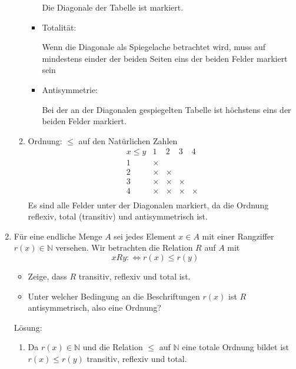 \documentclass[main.tex]{subfiles}
\begin{document}
\begin{enumerate}
\begin{enumerate}
\begin{itemize}
			                  Die Diagonale der Tabelle ist markiert.
			            \item Totalität:

			                  Wenn die Diagonale als Spiegelache betrachtet wird, muss auf mindestens
			                  einder der beiden Seiten eins der beiden Felder markiert sein
			            \item Antisymmetrie:

			                  Bei der an der Diagonalen gespiegelten Tabelle ist höchstens eins
			                  der beiden Felder markiert.
		            \end{itemize}
		      \item
		            Ordnung: \( \leq \) auf den Natürlichen Zahlen
		            \[
			            \begin{array}{ c|c|c|c|c }
				            x \leq y & 1      & 2      & 3      & 4      \\
				            \hline
				            1        & \times &        &        &        \\
				            \hline
				            2        & \times & \times &        &        \\
				            \hline
				            3        & \times & \times & \times &        \\
				            \hline
				            4        & \times & \times & \times & \times \\
			            \end{array}
		            \]
		            Es sind alle Felder unter der Diagonalen markiert, da die Ordnung reflexiv, total (transitiv) und
		            antisymmetrisch ist.
	      \end{enumerate}
	\item  Für eine endliche Menge \( A \) sei jedes Element \( x \in A \) mit einer Rangziffer
	      \( r(x) \in \mathbb{N} \) versehen. Wir betrachten die Relation \( R \) auf \( A \) mit
	      \[ xRy: \Leftrightarrow r(x) \leq r(y) \]
	      \begin{itemize}
		      \item Zeige, dass \( R \) transitiv, reflexiv und total ist.
		      \item Unter welcher Bedingung an die Beschriftungen \( r(x) \) ist \( R \) antisymmetrisch,
		            also eine Ordnung?
	      \end{itemize}

	      Lösung:
	      \begin{enumerate}
		      \item Da \( r(x) \in \mathbb{N} \) und die Relation \( \leq \) auf \( \mathbb{N} \)
		            eine totale Ordnung bildet ist \( r(x) \leq r(y) \) transitiv, reflexiv und total.


\end{enumerate}
\end{enumerate}
\end{document}
